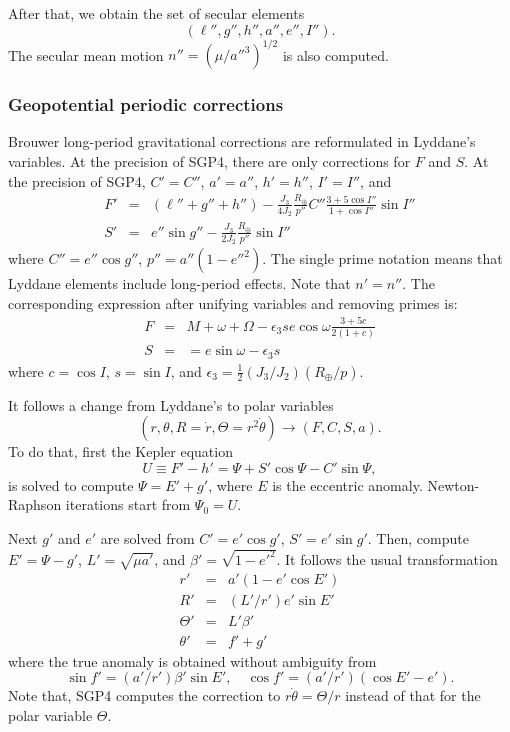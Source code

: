 \documentclass{article}
\begin{document}
After that, we obtain the set of secular elements
\[
(\ell'',g'',h'',a'',e'',I'').
\]
The secular mean motion $n''=(\mu/a''^3)^{1/2}$ is also computed.

\subsubsection{Geopotential periodic corrections} \label{s:SGP4lp}


Brouwer long-period gravitational corrections are reformulated in Lyddane's variables. At the precision of SGP4, there are only corrections for $F$ and $S$. At the precision of SGP4, $C'= C''$, $a'=a''$, $h'=h''$, $I'=I''$, and
\begin{eqnarray*}
F' &=& (\ell''+g''+h'')-\frac{J_3}{4J_2}\frac{R_\oplus}{p''}C''\frac{3+5\cos{I}''}{1+\cos{I}''}\sin{I}'' \\
S' &=&  e''\sin{g}'' -\frac{J_3}{2J_2}\frac{R_\oplus}{p''}\sin{I}''
\end{eqnarray*}
where $C''=e''\cos{g}''$, $p''=a''(1-e''^2)$. The single prime notation means that Lyddane elements include long-period effects. Note that $n'=n''$.
The corresponding expression after unifying variables and removing primes is:
\begin{eqnarray*}
F &=&  M + \omega + \Omega - \epsilon_3 s e \cos{\omega}\frac{3+5c}{2(1+c)} \\
S &=& = e\sin{\omega} - \epsilon_3 s
\end{eqnarray*}
where $c=\cos{I}$, $s=\sin{I}$, and $\epsilon_3=\frac{1}{2}(J_3/J_2)(R_\oplus/p)$.


It follows a change from Lyddane's to polar variables
\[
(r,\theta,R=\dot{r},\Theta=r^2\dot\theta)\longrightarrow(F,C,S,a).
\]
To do that, first the Kepler equation
\[
U\equiv{F'-h'}=\Psi+S'\cos\Psi-C'\sin\Psi,
\]
is solved to compute $\Psi=E'+g'$, where $E$ is the eccentric anomaly. Newton-Raphson iterations start from $\Psi_0=U$.

Next $g'$ and $e'$ are solved from $C'=e'\cos{g'}$, $S'=e'\sin{g}'$. Then, compute $E'=\Psi-g'$, $L'=\sqrt{\mu{a}'}$, and $\beta'=\sqrt{1-e'^2}$. It follows the usual transformation
\begin{eqnarray} \label{utor}
r' &=& a'(1-e'\cos{E}') \\
R' &=& (L'/r')e'\sin{E}' \\
\Theta' &=& L'\beta' \\
\theta' &=& f'+g'
\end{eqnarray}
where the true anomaly is obtained without ambiguity from
\begin{equation} \label{utof}
\sin{f}'=(a'/r')\beta'\sin{E}',\quad \cos{f}'=(a'/r')(\cos{E}'-e').
\end{equation}
Note that, SGP4 computes the correction to $r\dot\theta=\Theta/r$ instead of that for the polar variable $\Theta$.
\end{document}
